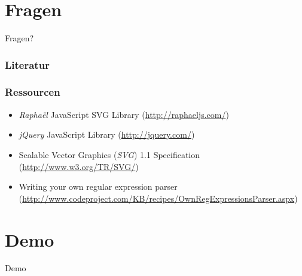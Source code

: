 \documentclass[ignorenonframetext]{beamer}
\begin{document}
\section*{Fragen}
\begin{frame}[plain]
    \begin{center}
        \Huge{Fragen?}
    \end{center}
\end{frame}


\begin{frame}[allowframebreaks]
    \frametitle{Literatur}
    
    
    \nocite{*}
\end{frame}

\begin{frame}
    \frametitle{Ressourcen}

    \begin{itemize}
        \item \textit{Rapha\"el} JavaScript SVG Library (\url{http://raphaeljs.com/})
        \item \textit{jQuery} JavaScript Library (\url{http://jquery.com/})
        \item Scalable Vector Graphics (\textit{SVG}) 1.1 Specification (\url{http://www.w3.org/TR/SVG/})
        \item Writing your own regular expression parser (\url{http://www.codeproject.com/KB/recipes/OwnRegExpressionsParser.aspx})
    \end{itemize}
\end{frame}


\section{Demo}
\begin{frame}[plain]
    \begin{center}
        \Huge{Demo}
    \end{center}
\end{frame}
\end{document}
